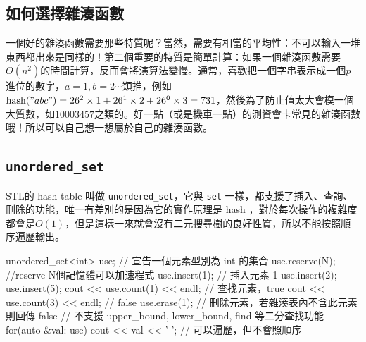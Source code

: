 \documentclass[main.tex]{subfiles}
\begin{document}
\subsection{如何選擇雜湊函數}
一個好的雜湊函數需要那些特質呢？當然，需要有相當的平均性：不可以輸入一堆東西都出來是同樣的！第二個重要的特質是簡單計算：如果一個雜湊函數需要$O(n^2)$的時間計算，反而會將演算法變慢。通常，喜歡把一個字串表示成一個$p$進位的數字，$a = 1, b = 2\cdots$類推，例如$\text{hash}("abc") = 26^2 \times 1 + 26^1 \times 2 + 26^0 \times 3 = 731$，然後為了防止值太大會模一個大質數，如$10003457$之類的。好一點（或是機車一點）的測資會卡常見的雜湊函數哦！所以可以自己想一想屬於自己的雜湊函數。
\subsection{\texttt{unordered\_set}} 
STL的 hash table 叫做 \texttt{unordered\_set}，它與 \texttt{set} 一樣，都支援了插入、查詢、刪除的功能，唯一有差別的是因為它的實作原理是 hash ，對於每次操作的複雜度都會是$O(1)$，但是這樣一來就會沒有二元搜尋樹的良好性質，所以不能按照順序遍歷輸出。
\begin{C++}
unordered_set<int> use; // 宣告一個元素型別為 int 的集合
use.reserve(N); //reserve N個記憶體可以加速程式
use.insert(1); // 插入元素 1
use.insert(2);
use.insert(5);
cout << use.count(1) << endl; // 查找元素，true
cout << use.count(3) << endl; // false
use.erase(1); // 刪除元素，若雜湊表內不含此元素則回傳 false
// 不支援 upper_bound, lower_bound, find 等二分查找功能
for(auto &val: use)
    cout << val << ' ';
// 可以遍歷，但不會照順序
\end{C++}
\end{document}

